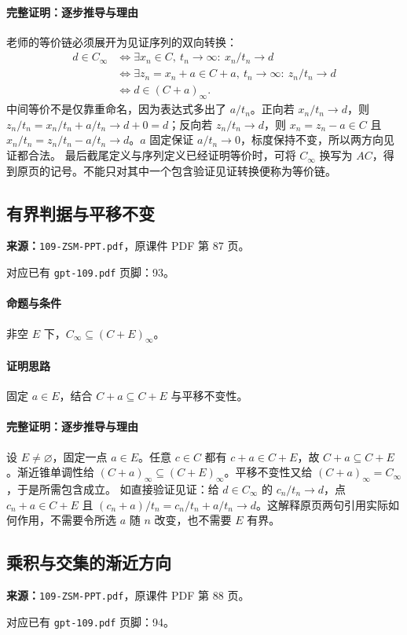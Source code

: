\paragraph{完整证明：逐步推导与理由}

老师的等价链必须展开为见证序列的双向转换：
\begin{align*}
d\in C_\infty
&\iff\exists x_n\in C,\ t_n\to\infty:\ x_n/t_n\to d\\
&\iff\exists z_n=x_n+a\in C+a,\ t_n\to\infty:\ z_n/t_n\to d\\
&\iff d\in(C+a)_\infty.
\end{align*}
中间等价不是仅靠重命名，因为表达式多出了 $a/t_n$。正向若 $x_n/t_n\to d$，则 $z_n/t_n=x_n/t_n+a/t_n\to d+0=d$；反向若 $z_n/t_n\to d$，则 $x_n=z_n-a\in C$ 且 $x_n/t_n=z_n/t_n-a/t_n\to d$。$a$ 固定保证 $a/t_n\to0$，标度保持不变，所以两方向见证都合法。
最后截尾定义与序列定义已经证明等价时，可将 $C_\infty$ 换写为 $AC$，得到原页的记号。不能只对其中一个包含验证见证转换便称为等价链。

\clearpage\subsection{有界判据与平移不变}
\textbf{来源：}\texttt{109-ZSM-PPT.pdf}，原课件 PDF 第 87 页。\par
对应已有 \texttt{gpt-109.pdf} 页脚：93。\par
\paragraph{命题与条件}非空 $E$ 下，$C_\infty\subseteq(C+E)_\infty$。
\paragraph{证明思路}固定 $a\in E$，结合 $C+a\subseteq C+E$ 与平移不变性。
\paragraph{完整证明：逐步推导与理由}

设 $E\ne\varnothing$，固定一点 $a\in E$。任意 $c\in C$ 都有 $c+a\in C+E$，故 $C+a\subseteq C+E$。渐近锥单调性给 $(C+a)_\infty\subseteq(C+E)_\infty$。平移不变性又给 $(C+a)_\infty=C_\infty$，于是所需包含成立。
如直接验证见证：给 $d\in C_\infty$ 的 $c_n/t_n\to d$，点 $c_n+a\in C+E$ 且 $(c_n+a)/t_n=c_n/t_n+a/t_n\to d$。这解释原页两句引用实际如何作用，不需要令所选 $a$ 随 $n$ 改变，也不需要 $E$ 有界。

\clearpage\subsection{乘积与交集的渐近方向}
\textbf{来源：}\texttt{109-ZSM-PPT.pdf}，原课件 PDF 第 88 页。\par
对应已有 \texttt{gpt-109.pdf} 页脚：94。\par
